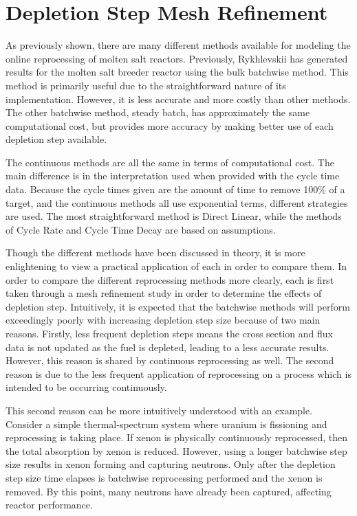 \renewcommand*\descriptionlabel[1]{\hspace\leftmargin$#1$}
\setcounter{tocdepth}{5}
\setcounter{secnumdepth}{5}


\section{Depletion Step Mesh Refinement}

As previously shown, there are many different methods available for modeling the online reprocessing of molten salt reactors. Previously, Rykhlevskii has generated results for the molten salt breeder reactor using the bulk batchwise method. This method is primarily useful due to the straightforward nature of its implementation. However, it is less accurate and more costly than other methods. The other batchwise method, steady batch, has approximately the same computational cost, but provides more accuracy by making better use of each depletion step available.

The continuous methods are all the same in terms of computational cost. The main difference is in the interpretation used when provided with the cycle time data. Because the cycle times given are the amount of time to remove 100\% of a target, and the continuous methods all use exponential terms, different strategies are used. The most straightforward method is Direct Linear, while the methods of Cycle Rate and Cycle Time Decay are based on assumptions.

Though the different methods have been discussed in theory, it is more enlightening to view a practical application of each in order to compare them. In order to compare the different reprocessing methods more clearly, each is first taken through a mesh refinement study in order to determine the effects of depletion step. Intuitively, it is expected that the batchwise methods will perform exceedingly poorly with increasing depletion step size because of two main reasons. Firstly, less frequent depletion steps means the cross section and flux data is not updated as the fuel is depleted, leading to a less accurate results. However, this reason is shared by continuous reprocessing as well. The second reason is due to the less frequent application of reprocessing on a process which is intended to be occurring continuously.

This second reason can be more intuitively understood with an example. Consider a simple thermal-spectrum system where uranium is fissioning and reprocessing is taking place. If xenon is physically continuously reprocessed, then the total absorption by xenon is reduced. However, using a longer batchwise step size results in xenon forming and capturing neutrons. Only after the depletion step size time elapses is batchwise reprocessing performed and the xenon is removed. By this point, many neutrons have already been captured, affecting reactor performance.

